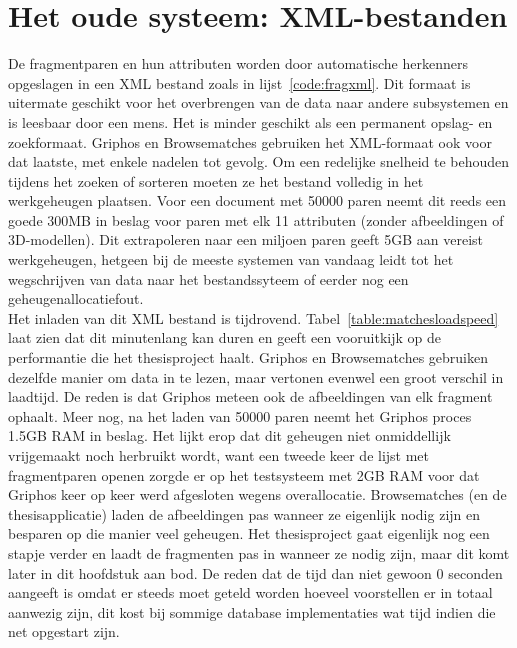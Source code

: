 \section{Het oude systeem: XML-bestanden}
De fragmentparen en hun attributen worden door automatische herkenners opgeslagen in een XML bestand zoals in lijst~\ref{code:fragxml}. Dit formaat is uitermate geschikt voor het overbrengen van de data naar andere subsystemen en is leesbaar door een mens. Het is minder geschikt als een permanent opslag- en zoekformaat. Griphos en Browsematches gebruiken het XML-formaat ook voor dat laatste, met enkele nadelen tot gevolg. Om een redelijke snelheid te behouden tijdens het zoeken of sorteren moeten ze het bestand volledig in het werkgeheugen plaatsen. Voor een document met 50000 paren neemt dit reeds een goede 300MB in beslag voor paren met elk 11 attributen (zonder afbeeldingen of 3D-modellen). Dit extrapoleren naar een miljoen paren geeft 5GB aan vereist werkgeheugen, hetgeen bij de meeste systemen van vandaag leidt tot het wegschrijven van data naar het bestandssyteem of eerder nog een geheugenallocatiefout.\\



Het inladen van dit XML bestand is tijdrovend. Tabel~\ref{table:matchesloadspeed} laat zien dat dit minutenlang kan duren en geeft een vooruitkijk op de performantie die het thesisproject haalt. Griphos en Browsematches gebruiken dezelfde manier om data in te lezen, maar vertonen evenwel een groot verschil in laadtijd. De reden is dat Griphos meteen ook de afbeeldingen van elk fragment ophaalt. Meer nog, na het laden van 50000 paren neemt het Griphos proces 1.5GB RAM in beslag. Het lijkt erop dat dit geheugen niet onmiddellijk vrijgemaakt noch herbruikt wordt, want een tweede keer de lijst met fragmentparen openen zorgde er op het testsysteem met 2GB RAM voor dat Griphos keer op keer werd afgesloten wegens overallocatie. Browsematches (en de thesisapplicatie) laden de afbeeldingen pas wanneer ze eigenlijk nodig zijn en besparen op die manier veel geheugen. Het thesisproject gaat eigenlijk nog een stapje verder en laadt de fragmenten pas in wanneer ze nodig zijn, maar dit komt later in dit hoofdstuk aan bod. De reden dat de tijd dan niet gewoon 0 seconden aangeeft is omdat er steeds moet geteld worden hoeveel voorstellen er in totaal aanwezig zijn, dit kost bij sommige database implementaties wat tijd indien die net opgestart zijn.

